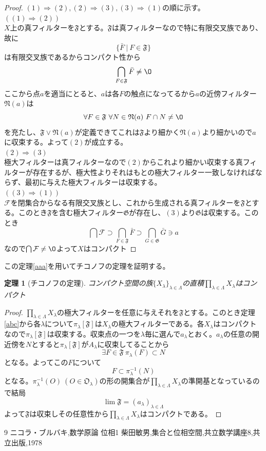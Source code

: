 \documentclass[leqno]{jsarticle}
\newtheorem{thm}{定理}
\newcommand{\To}{\Longrightarrow}
\newcommand{\dpst}{\displaystyle}
\newcommand{\ff}{\mathfrak{F}}
\newcommand{\GG}{\mathfrak{G}}
\newcommand{\fff}{\mathcal{F}}
\newcommand{\la}{\lambda}
\newcommand{\La}{\Lambda}
\begin{document}
\begin{proof}$(1)\To (2),(2)\To(3),(3)\To(1)$の順に示す。\\ 
$((1)\To(2))$\\ 
$X$上の真フィルターを$\ff$とする。$\ff$は真フィルターなので特に有限交叉族であり、故に
\[
\{\bar{F}\ |\ F\in \ff\}
\]
は有限交叉族であるからコンパクト性から
\[
\bigcap_{F\in\ff}\bar{F}\neq\O
\]ここから点$a$を適当にとると、$a$は各$F$の触点になってるから$a$の近傍フィルター$\mathfrak{N}(a)$は
\[
\forall F\in \ff\ \forall N\in \mathfrak{N}(a)\ F\cap N\neq\O
\]を充たし、$\ff\vee \mathfrak{N}(a)$が定義できてこれは$\ff$より細かく$\mathfrak{N}(a)$より細かいので$a$に収束する。よって$(2)$が成立する。\\ 
$(2)\To(3)$\\
極大フィルターは真フィルターなので$(2)$からこれより細かい収束する真フィルターが存在するが、極大性よりそれはもとの極大フィルター一致しなければならず、最初に与えた極大フィルターは収束する。\\ 
$((3)\To(1))$\\ 
$\mathcal{F}$を閉集合からなる有限交叉族とし、これから生成される真フィルターを$\ff$とする。このとき$\ff$を含む極大フィルター$\GG$が存在し、$(3)$より$\GG$は収束する。このとき
\[
\bigcap\fff\supset\bigcap_{F\in\ff}\bar{F}\supset \bigcap_{G\in\GG}\bar{G}\ni a
\]
なので$\bigcap\fff\neq\O$よって$X$はコンパクト
\end{proof}

この定理\ref{aaa}を用いてチコノフの定理を証明する。
\begin{thm}[チコノフの定理]
コンパクト空間の族$\{X_{\la}\}_{\la\in \La}$の直積$\dpst \prod_{\la\in \La}X_{\la}$はコンパクト
\end{thm}
\begin{proof}
$\dpst \prod_{\la\in \La}X_{\la}$の極大フィルターを任意に与えそれを$\ff$とする。このとき定理\ref{abc}から各$\la$について$\pi_{\la}[\ff]$は$X_{\la}$の極大フィルターである。各$X_{\la}$はコンパクトなので$\pi_{\la}[\ff]$は収束する。収束点の一つを$\la$毎に選んで$a_{\la}$とおく。$a_{\la}$の任意の開近傍を$N$とすると$\pi_{\la}[\ff]$が$A_{\la}$に収束してることから
\[
\exists F\in \ff\ \pi_{\la}(F)\subset N
\]
となる。よってこの$F$について
\[
F\subset \pi_{\la}^{-1}(N)
\]となる。$\pi_{\la}^{-1}(O)\ (O\in \mathfrak{O}_{\lambda})$の形の開集合が$\dpst \prod_{\la\in \La}X_{\la}$の準開基となっているので結局
\[
\lim\ff=(a_{\la})_{\la\in\La}
\]よって$\ff$は収束しその任意性から$\dpst \prod_{\la\in \La}X_{\la}$はコンパクトである。
\end{proof}



\begin{thebibliography}{9}
ニコラ・ブルバキ,数学原論 位相1
柴田敏男,集合と位相空間,共立数学講座8,共立出版,1978
\end{thebibliography}




			
\end{document}
